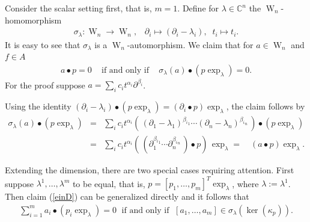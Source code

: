 \documentclass[a4paper,10pt]{article}
\theoremstyle{nonumberplain}
\newcommand{\C}{\mathbb{C}}
\DeclareMathOperator{\W}{W}
\begin{document}
Consider the scalar setting first, that is, $m=1$. Define for $\lambda \in \C^n$ the 
$\W_n$-homomorphism
\begin{eqnarray*}
\sigma_{\lambda}: \W_n \rightarrow \W_n, \;\;\; \partial_i \mapsto (\partial_i - \lambda_i), \;\; t_i \mapsto t_i .
\end{eqnarray*}
It is easy to see that $\sigma_{\lambda}$ is a $\W_n$-automorphism. 
We claim that for $a \in \W_n$ and $f \in A$
\begin{eqnarray}\label{einD} 
a \bullet p =0 \;\;\; \mbox{ if and only if } \;\;\; \sigma_{\lambda}(a) \bullet (p \exp_{\lambda})=0.
\end{eqnarray}
For the proof suppose $a= \sum_i c_i t^{\alpha_i} \partial^{\beta_i}$. 

Using the identity 
$(\partial_i - \lambda_i) \bullet (p \exp_{\lambda}) = (\partial_i \bullet p)\exp_{\lambda} $, 
the claim follows by
\begin{eqnarray*}
\sigma_{\lambda}(a) \bullet (p \exp_{\lambda}) 
&=& \sum_i c_i t^{\alpha_i}(\, (\partial_1-\lambda_1)^{{\beta_i}_1} \cdots (\partial_n-\lambda_n)^{{\beta_i}_n}\,) \bullet (p \exp_{\lambda})\\
& = &\sum_i c_i t^{\alpha_i}(\, (\partial_1^{{\beta_i}_1} \cdots \partial_n^{{\beta_i}_n}\,) \bullet p) \, \exp_{\lambda}
= \quad (a\bullet p)\exp_{\lambda} .
\end{eqnarray*}

Extending the dimension, there are two special cases requiring attention. 
First suppose $\lambda^1, \dots, \lambda^m$ to be equal, that is, $p=[p_1, \dots, p_m]^{T} \exp_{\lambda}$, 
where $\lambda:=\lambda^1$. Then claim (\ref{einD}) can be generalized directly and it follows that
\begin{eqnarray}\label{mD}
\sum_{i=1}^m a_i \bullet (p_i \exp_{\lambda}) = 0  \; \mbox{ if and only if } \; [a_1, 
\dots, a_m] \in \sigma_{\lambda} ( \ker(\kappa_{p}) ) .
\end{eqnarray}
\end{document}
